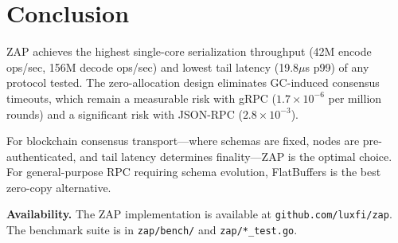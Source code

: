 \section{Conclusion}


ZAP achieves the highest single-core serialization throughput (42M encode ops/sec, 156M decode ops/sec) and lowest tail latency (19.8$\mu$s p99) of any protocol tested. The zero-allocation design eliminates GC-induced consensus timeouts, which remain a measurable risk with gRPC ($1.7 \times 10^{-6}$ per million rounds) and a significant risk with JSON-RPC ($2.8 \times 10^{-3}$).

For blockchain consensus transport---where schemas are fixed, nodes are pre-authenticated, and tail latency determines finality---ZAP is the optimal choice. For general-purpose RPC requiring schema evolution, FlatBuffers is the best zero-copy alternative.

\vspace{1em}
\noindent\textbf{Availability.} The ZAP implementation is available at \texttt{github.com/luxfi/zap}. The benchmark suite is in \texttt{zap/bench/} and \texttt{zap/*\_test.go}.

